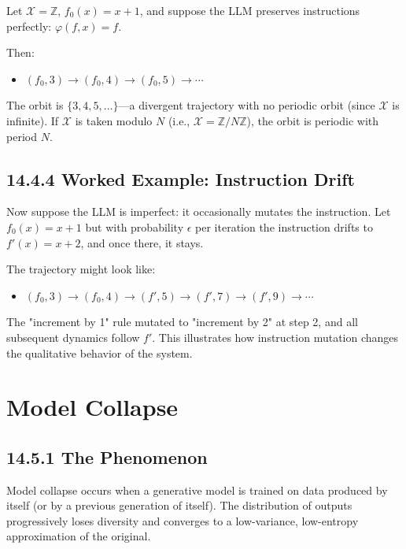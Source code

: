 Let $\mathcal{X} = \mathbb{Z}$, $f_0(x) = x + 1$, and suppose the LLM preserves instructions perfectly: $\varphi(f, x) = f$.

Then:
\begin{itemize}
\item $(f_0, 3) \to (f_0, 4) \to (f_0, 5) \to \cdots$
\end{itemize}

The orbit is $\{ 3, 4, 5, \ldots\} $---a divergent trajectory with no periodic orbit (since $\mathcal{X}$ is infinite). If $\mathcal{X}$ is taken modulo $N$ (i.e., $\mathcal{X} = \mathbb{Z}/N\mathbb{Z}$), the orbit is periodic with period $N$.

\subsection{14.4.4 Worked Example: Instruction Drift}

Now suppose the LLM is imperfect: it occasionally mutates the instruction. Let $f_0(x) = x + 1$ but with probability $\epsilon$ per iteration the instruction drifts to $f'(x) = x + 2$, and once there, it stays.

The trajectory might look like:
\begin{itemize}
\item $(f_0, 3) \to (f_0, 4) \to (f', 5) \to (f', 7) \to (f', 9) \to \cdots$
\end{itemize}

The "increment by 1" rule mutated to "increment by 2" at step 2, and all subsequent dynamics follow $f'$. This illustrates how instruction mutation changes the qualitative behavior of the system.



\section{Model Collapse}

\subsection{14.5.1 The Phenomenon}

Model collapse occurs when a generative model is trained on data produced by itself (or by a previous generation of itself). The distribution of outputs progressively loses diversity and converges to a low-variance, low-entropy approximation of the original.

